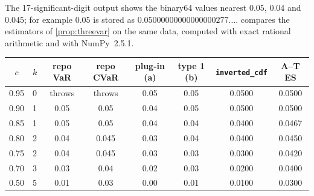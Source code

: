 The 17-significant-digit output shows the binary64 values nearest $0.05$, $0.04$ and $0.045$; for example $0.05$ is
stored as $0.05000000000000000277\ldots$.  compares the estimators of \cref{prop:threevar} on the same data,
computed with exact rational arithmetic and with NumPy~2.5.1.

\begin{center}
\small
\begin{tabular}{@{}cccccccc@{}}
\toprule
\textcolor{muted}{$c$} & \textcolor{muted}{$k$} & \textcolor{muted}{repo VaR} & \textcolor{muted}{repo CVaR} & \textcolor{muted}{plug-in (a)} & \textcolor{muted}{type 1 (b)} & \textcolor{muted}{\texttt{inverted\_cdf}} & \textcolor{muted}{A--T ES}\\
\midrule
0.95 & 0 & throws & throws & 0.05 & 0.05 & 0.0500 & 0.0500\\
0.90 & 1 & 0.05 & 0.05 & 0.04 & 0.05 & 0.0500 & 0.0500\\
0.85 & 1 & 0.05 & 0.05 & 0.04 & 0.04 & 0.0400 & 0.0467\\
0.80 & 2 & 0.04 & 0.045 & 0.03 & 0.04 & 0.0400 & 0.0450\\
0.75 & 2 & 0.04 & 0.045 & 0.03 & 0.03 & 0.0300 & 0.0420\\
0.70 & 3 & 0.03 & 0.04 & 0.02 & 0.03 & 0.0200\rlap{$^\ast$} & 0.0400\\
0.50 & 5 & 0.01 & 0.03 & 0.00 & 0.01 & 0.0100 & 0.0300\\
\bottomrule
\end{tabular}
\label{tab:quantiles}
\end{center}

